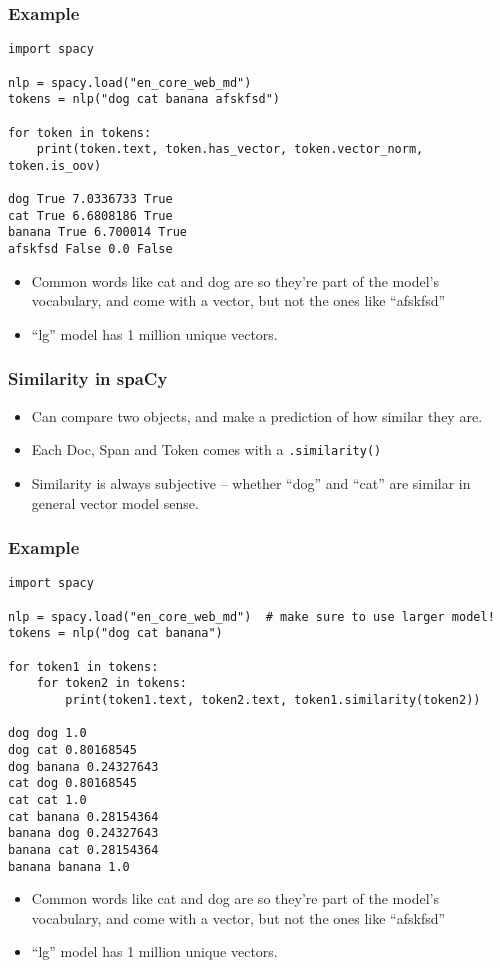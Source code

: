 \begin{frame}[fragile]\frametitle{Example}

\begin{lstlisting}
import spacy

nlp = spacy.load("en_core_web_md")
tokens = nlp("dog cat banana afskfsd")

for token in tokens:
    print(token.text, token.has_vector, token.vector_norm, token.is_oov)
		
dog True 7.0336733 True
cat True 6.6808186 True
banana True 6.700014 True
afskfsd False 0.0 False
\end{lstlisting}

\begin{itemize}
\item Common words like cat and dog are so they’re part of the model’s vocabulary, and come with a vector, but not the ones like ``afskfsd''
\item ``lg'' model has 1 million unique vectors.
\end{itemize}
\end{frame}

\begin{frame}[fragile]\frametitle{Similarity in spaCy}

\begin{itemize}
\item Can compare two objects, and make a prediction of how similar they are. 
\item Each Doc, Span and Token comes with a \lstinline|.similarity()|
\item Similarity is always subjective – whether “dog” and “cat” are similar in general vector model sense.
\end{itemize}
\end{frame}
\begin{frame}[fragile]\frametitle{Example}

\begin{lstlisting}
import spacy

nlp = spacy.load("en_core_web_md")  # make sure to use larger model!
tokens = nlp("dog cat banana")

for token1 in tokens:
    for token2 in tokens:
        print(token1.text, token2.text, token1.similarity(token2))
		
dog dog 1.0
dog cat 0.80168545
dog banana 0.24327643
cat dog 0.80168545
cat cat 1.0
cat banana 0.28154364
banana dog 0.24327643
banana cat 0.28154364
banana banana 1.0
\end{lstlisting}

\begin{itemize}
\item Common words like cat and dog are so they’re part of the model’s vocabulary, and come with a vector, but not the ones like ``afskfsd''
\item ``lg'' model has 1 million unique vectors.
\end{itemize}
\end{frame}

